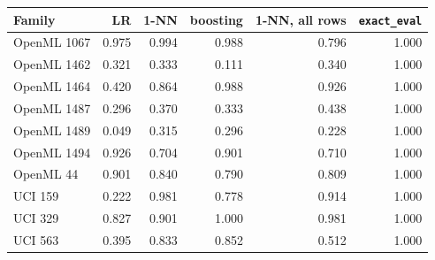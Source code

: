 \begin{tabular}{lrrrrr}\toprule
Family & LR & 1-NN & boosting & 1-NN, all rows & \texttt{exact\_eval}\\\midrule
OpenML 1067 & 0.975 & 0.994 & 0.988 & 0.796 & 1.000\\
OpenML 1462 & 0.321 & 0.333 & 0.111 & 0.340 & 1.000\\
OpenML 1464 & 0.420 & 0.864 & 0.988 & 0.926 & 1.000\\
OpenML 1487 & 0.296 & 0.370 & 0.333 & 0.438 & 1.000\\
OpenML 1489 & 0.049 & 0.315 & 0.296 & 0.228 & 1.000\\
OpenML 1494 & 0.926 & 0.704 & 0.901 & 0.710 & 1.000\\
OpenML 44 & 0.901 & 0.840 & 0.790 & 0.809 & 1.000\\
UCI 159 & 0.222 & 0.981 & 0.778 & 0.914 & 1.000\\
UCI 329 & 0.827 & 0.901 & 1.000 & 0.981 & 1.000\\
UCI 563 & 0.395 & 0.833 & 0.852 & 0.512 & 1.000\\
\bottomrule\end{tabular}
